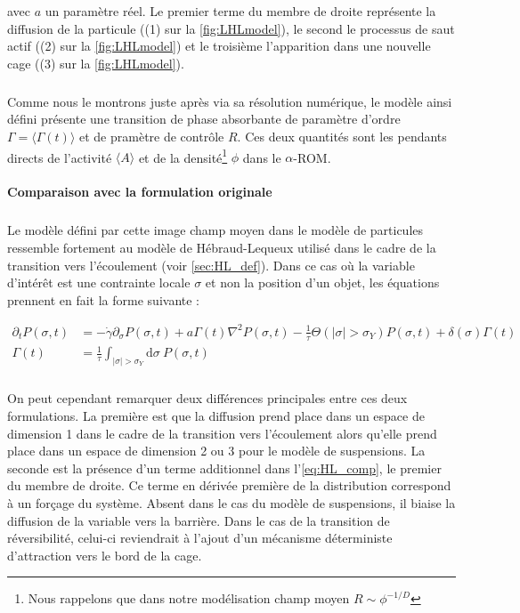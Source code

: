 \noindent avec $a$ un paramètre réel. Le premier terme du membre de droite représente la diffusion de la particule ((1) sur la \autoref{fig:LHLmodel}), le second le processus de saut actif ((2) sur la \autoref{fig:LHLmodel}) et le troisième l'apparition dans une nouvelle cage ((3) sur la \autoref{fig:LHLmodel}). 

\subparagraph{}Comme nous le montrons juste après via sa résolution numérique, le modèle ainsi défini présente une transition de phase absorbante de paramètre d'ordre $\Gamma = \langle \Gamma (t) \rangle$ et de pramètre de contrôle $R$. Ces deux quantités sont les pendants directs de l'activité $\langle A \rangle$ et de la densité\footnote{Nous rappelons que dans notre modélisation champ moyen $R\sim \phi^{-1/D}$} $\phi$ dans le $\alpha$-ROM.


\paragraph{Comparaison avec la formulation originale}

\subparagraph{}Le modèle défini par cette image champ moyen dans le modèle de particules ressemble fortement au modèle de Hébraud-Lequeux utilisé dans le cadre de la transition vers l'écoulement (voir \autoref{sec:HL_def}). Dans ce cas où la variable d'intérêt est une contrainte locale $\sigma$ et non la position d'un objet, les équations prennent en fait la forme suivante :

\begin{equation}
\begin{aligned}
    \partial_t P(\sigma, t) &= -\dot{\gamma}\partial_\sigma P(\sigma, t)+a\Gamma (t)\nabla^2 P(\sigma, t) - \frac{1}{\tau}\Theta(|\sigma|>\sigma_Y)P(\sigma, t) + \delta(\sigma)\Gamma (t)\\
    \Gamma (t) &= \frac{1}{\tau}\int_{|\sigma|>\sigma_Y}\mathrm{d}\sigma~P(\sigma, t)
\end{aligned}
\label{eq:HL_comp}
\end{equation} 

\subparagraph{} On peut cependant remarquer deux différences principales entre ces deux formulations. La première est que la diffusion prend place dans un espace de dimension 1 dans le cadre de la transition vers l'écoulement alors qu'elle prend place dans un espace de dimension 2 ou 3 pour le modèle de suspensions. La seconde est la présence d'un terme additionnel dans l'\autoref{eq:HL_comp}, le premier du membre de droite. Ce terme en dérivée première de la distribution correspond à un forçage du système. Absent dans le cas du modèle de suspensions, il biaise la diffusion de la variable vers la barrière. Dans le cas de la transition de réversibilité, celui-ci reviendrait à l'ajout d'un mécanisme déterministe d'attraction vers le bord de la cage.

